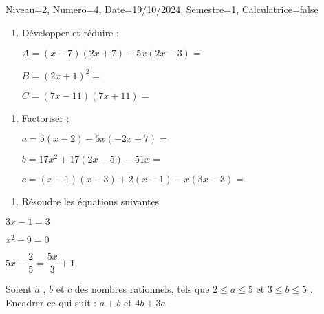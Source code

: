 \documentclass[a4paper,12pt]{article}
\begin{document}
\begin{Maquette}[DS]{Niveau=2, Numero=4, Date=19/10/2024, Semestre=1, Calculatrice=false}


\begin{exercice}
\begin{enumerate}
\item{} Développer et réduire :

\(
A=\left(x-7\right)\left(2x+7\right)-5x\left(2x-3\right)=\)\anserline[2]


\(
B=\left(2x+1\right)^{2}=\)
\anserline[1]


\(
C=\left(7x-11\right)\left(7x+11\right)=\)
\anserline[1]

\end{enumerate}
\end{exercice}

\begin{exercice}
\begin{enumerate}
\item{} Factoriser :

\(
a=5\left(x-2\right)-5x\left(-2x+7\right)=\)
\anserline[1]


\(
b=17x^{2}+17\left(2x-5\right)-51x=\)
\anserline[1]


\(
c=\left(x-1\right)\left(x-3\right)+2\left(x-1\right)-x\left(3x-3\right)=\)
\anserline[1]

\end{enumerate}
\end{exercice}

\begin{exercice}
\begin{enumerate}
\item{} Résoudre les équations suivantes 
\end{enumerate}
\begin{multicols}{3}
\(3x-1=3\)\newline
\anserline[4]
\columnbreak

\(x^{2}-9=0\)\newline
\anserline[4]
\columnbreak

\(5x-\dfrac{2}{5}=\dfrac{5x}{3}+1\)\newline
\anserline[4]
\end{multicols}
\end{exercice}

\begin{exercice}
Soient $a$ , $b$ et $c$ des nombres rationnels, tels que $2\leq a \leq 5$ et $3 \leq b \leq 5$ .\newline
  Encadrer ce qui suit :
\(
a+b\) et
\(4b+3a\)\newline
\anserline[5]
\end{exercice}
\end{Maquette}
\end{document}
